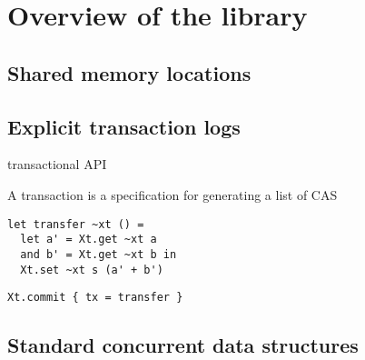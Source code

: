 \section{Overview of the library}

\subsection{Shared memory locations}



\subsection{Explicit transaction logs}



transactional API

A transaction is a specification for generating a list of CAS

\begin{verbatim}
let transfer ~xt () =
  let a' = Xt.get ~xt a
  and b' = Xt.get ~xt b in
  Xt.set ~xt s (a' + b')
\end{verbatim}

\begin{verbatim}
Xt.commit { tx = transfer }
\end{verbatim}

\subsection{Standard concurrent data structures}